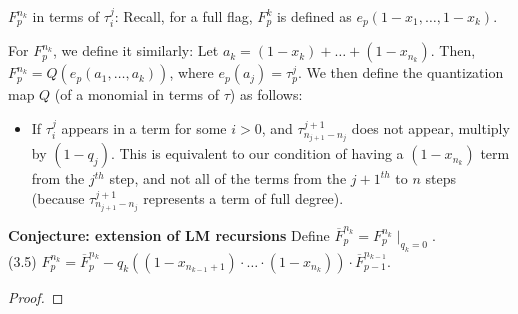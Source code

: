 \documentclass[11pt]{article}
\begin{document}




$F_p^{n_k}$ in terms of $\tau_i^j$: Recall, for a full flag, $F_p^k$ is defined as $e_p(1-x_1, \ldots, 1-x_k)$. 

For $F_p^{n_k}$, we define it similarly: Let $a_k = (1-x_k) + \ldots + (1-x_{n_k})$. Then,  $F_p^{n_k} = Q(e_p(a_1, \ldots, a_k))$, where $e_p(a_j) = \tau_p^j$. We then define the quantization map $Q$ (of a monomial in terms of $\tau$) as follows:
\begin{itemize}
    \item If $\tau_i^j$ appears in a term for some $i > 0$, and $\tau_{n_{j+1} - n_j}^{j+1}$ does not appear, multiply by $(1-q_j)$. This is equivalent to our condition of having a $(1-x_{n_k})$ term from the $j^{th}$ step, and not all of the terms from the $j+1^{th}$ to $n$ steps (because $\tau_{n_{j+1} - n_j}^{j+1}$ represents a term of full degree).
\end{itemize}

\textbf{Conjecture: extension of LM recursions}
Define $\overline{F}_p^{n_k} = F_p^{n_k} \mid_{q_{k} = 0}$. \\

(3.5) $F_p^{n_k} = \overline{F}_p^{n_k} - q_{k}\left((1-x_{n_{k-1}+1})\cdot \ldots \cdot (1-x_{n_k})\right) \cdot \overline{F}_{p-1}^{n_{k-1}}$.

\begin{proof}
    
\end{proof}
\end{document}
